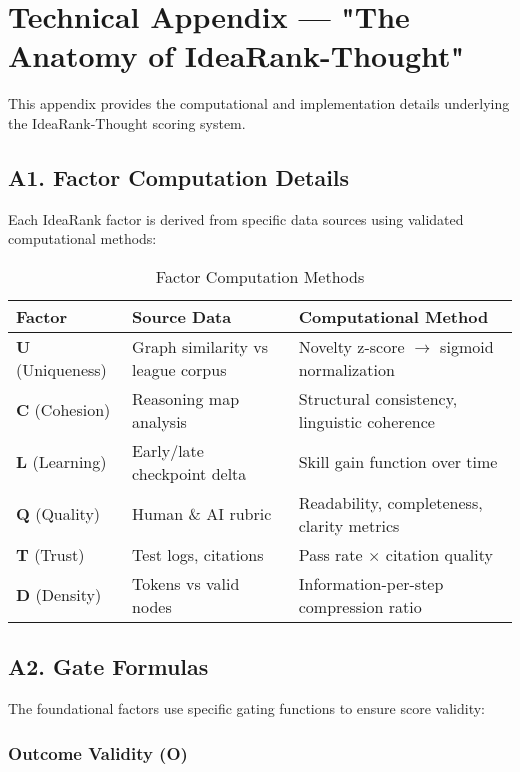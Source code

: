 \chapter{Technical Appendix — "The Anatomy of IdeaRank-Thought"}
\label{app:technical}

This appendix provides the computational and implementation details underlying the IdeaRank-Thought scoring system.

\section{A1. Factor Computation Details}

Each IdeaRank factor is derived from specific data sources using validated computational methods:

\begin{table}[h]
\centering
\small
\begin{tabular}{@{}p{2.5cm}p{4cm}p{6cm}@{}}
\toprule
\textbf{Factor} & \textbf{Source Data} & \textbf{Computational Method} \\ \midrule
\textbf{U} (Uniqueness) & Graph similarity vs league corpus & Novelty z-score $\rightarrow$ sigmoid normalization \\[0.5em]
\textbf{C} (Cohesion) & Reasoning map analysis & Structural consistency, linguistic coherence \\[0.5em]
\textbf{L} (Learning) & Early/late checkpoint delta & Skill gain function over time \\[0.5em]
\textbf{Q} (Quality) & Human \& AI rubric & Readability, completeness, clarity metrics \\[0.5em]
\textbf{T} (Trust) & Test logs, citations & Pass rate $\times$ citation quality \\[0.5em]
\textbf{D} (Density) & Tokens vs valid nodes & Information-per-step compression ratio \\ \bottomrule
\end{tabular}
\caption{Factor Computation Methods}
\label{tab:factor_computation}
\end{table}

\section{A2. Gate Formulas}

The foundational factors use specific gating functions to ensure score validity:

\subsection{Outcome Validity (O)}

